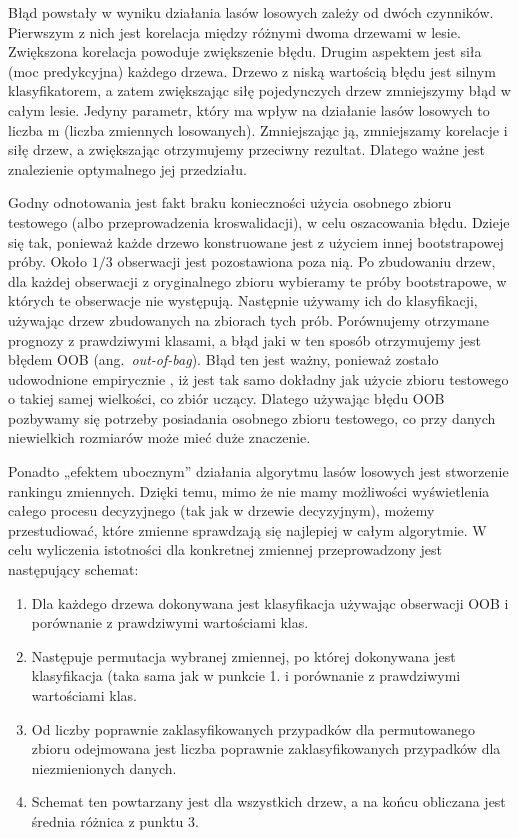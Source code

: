 \documentclass[12pt,a4paper,twoside,openany]{book}
\begin{document}
Błąd powstały w wyniku działania lasów losowych zależy od dwóch czynników. Pierwszym z nich jest korelacja między różnymi dwoma drzewami w lesie. Zwiększona korelacja powoduje zwiększenie błędu. Drugim aspektem jest siła (moc predykcyjna) każdego drzewa. Drzewo z niską wartością błędu jest silnym klasyfikatorem, a zatem zwiększając siłę pojedynczych drzew zmniejszymy błąd w całym lesie. Jedyny parametr, który ma wpływ na działanie lasów losowych to liczba m (liczba zmiennych losowanych). Zmniejszając ją, zmniejszamy korelacje i siłę drzew, a zwiększając otrzymujemy przeciwny rezultat. Dlatego ważne jest znalezienie optymalnego jej przedziału.

Godny odnotowania jest fakt braku konieczności użycia osobnego zbioru testowego (albo przeprowadzenia kroswalidacji), w celu oszacowania błędu. Dzieje się tak, ponieważ każde drzewo konstruowane jest z użyciem innej bootstrapowej próby. Około $1/3$ obserwacji jest pozostawiona poza nią. Po zbudowaniu drzew, dla każdej obserwacji z oryginalnego zbioru wybieramy te próby bootstrapowe, w których te obserwacje nie występują. Następnie używamy ich do klasyfikacji, używając drzew zbudowanych na zbiorach tych prób. Porównujemy otrzymane prognozy z prawdziwymi klasami, a błąd jaki w ten sposób otrzymujemy jest błędem OOB (ang.~\textit{out-of-bag}). Błąd ten jest ważny, ponieważ zostało udowodnione empirycznie \citep{breiman1996}, iż jest tak samo dokładny jak użycie zbioru testowego o takiej samej wielkości, co zbiór uczący. Dlatego używając błędu OOB pozbywamy się potrzeby posiadania osobnego zbioru testowego, co przy danych niewielkich rozmiarów może mieć duże znaczenie.

Ponadto „efektem ubocznym” działania algorytmu lasów losowych jest stworzenie rankingu zmiennych. Dzięki temu, mimo że nie mamy możliwości wyświetlenia całego procesu decyzyjnego (tak jak w drzewie decyzyjnym), możemy przestudiować, które zmienne sprawdzają się najlepiej w całym algorytmie. W celu wyliczenia istotności dla konkretnej zmiennej przeprowadzony jest następujący schemat:
\begin{enumerate}
\item Dla każdego drzewa dokonywana jest klasyfikacja używając obserwacji OOB i porównanie z prawdziwymi wartościami klas. 
\item Następuje permutacja wybranej zmiennej, po której dokonywana jest klasyfikacja (taka sama jak w punkcie 1. i porównanie z prawdziwymi wartościami klas.
\item Od liczby poprawnie zaklasyfikowanych przypadków dla permutowanego zbioru odejmowana jest liczba poprawnie zaklasyfikowanych przypadków dla niezmienionych danych.
\item Schemat ten powtarzany jest dla wszystkich drzew, a na końcu obliczana jest średnia różnica z punktu 3.
\end{enumerate}
\end{document}
